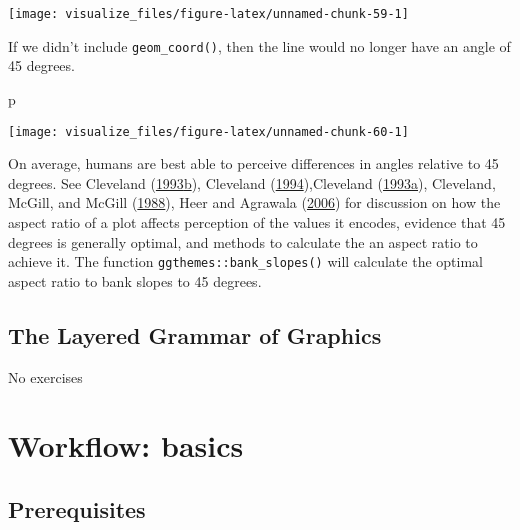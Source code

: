 \documentclass[]{book}
\newenvironment{Shaded}{\begin{snugshade}}{\end{snugshade}}
\newcommand{\NormalTok}[1]{#1}
\theoremstyle{plain}
\theoremstyle{remark}
\begin{document}
\begin{center}\texttt{[image: visualize\_files/figure-latex/unnamed-chunk-59-1]} \end{center}

If we didn't include \texttt{geom\_coord()}, then the line would no
longer have an angle of 45 degrees.

\begin{Shaded}
\begin{Highlighting}[]
\NormalTok{p}
\end{Highlighting}
\end{Shaded}

\begin{center}\texttt{[image: visualize\_files/figure-latex/unnamed-chunk-60-1]} \end{center}

On average, humans are best able to perceive differences in angles
relative to 45 degrees. See Cleveland
(\protect\hyperlink{ref-Cleveland1993}{1993}\protect\hyperlink{ref-Cleveland1993}{b}),
Cleveland (\protect\hyperlink{ref-Cleveland1994}{1994}),Cleveland
(\protect\hyperlink{ref-Cleveland1993a}{1993}\protect\hyperlink{ref-Cleveland1993a}{a}),
Cleveland, McGill, and McGill
(\protect\hyperlink{ref-ClevelandMcGillMcGill1988}{1988}), Heer and
Agrawala (\protect\hyperlink{ref-HeerAgrawala2006}{2006}) for discussion
on how the aspect ratio of a plot affects perception of the values it
encodes, evidence that 45 degrees is generally optimal, and methods to
calculate the an aspect ratio to achieve it. The function
\texttt{ggthemes::bank\_slopes()} will calculate the optimal aspect
ratio to bank slopes to 45 degrees.

\hypertarget{the-layered-grammar-of-graphics}{%
\section{The Layered Grammar of
Graphics}\label{the-layered-grammar-of-graphics}}

No exercises

\hypertarget{workflow-basics}{%
\chapter{Workflow: basics}\label{workflow-basics}}

\hypertarget{prerequisites}{%
\section*{Prerequisites}\label{prerequisites}}
\end{document}
